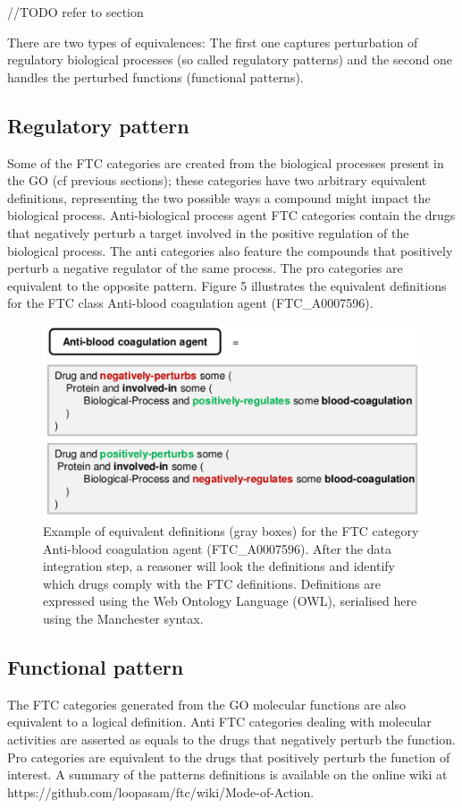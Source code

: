 \documentclass{bioinfo}
\begin{document}
//TODO refer to section

There are two types of equivalences: The first one captures perturbation of regulatory 
biological processes (so called regulatory patterns) and the second one handles the perturbed functions (functional patterns).

\subsection{Regulatory pattern}
Some of the FTC categories are created from the biological processes present in the 
GO (cf previous sections); these categories have two arbitrary equivalent definitions, representing the 
two possible ways a compound might impact the biological process. Anti-biological process agent FTC categories 
contain the drugs that negatively perturb a target involved in the positive regulation of the biological process. 
The anti categories also feature the compounds that positively perturb a negative regulator of the same process. 
The pro categories are equivalent to the opposite pattern. Figure 5 illustrates the equivalent definitions for the 
FTC class Anti-blood coagulation agent (FTC\_A0007596).
 
\begin{figure}[!tpb]%
\centerline{\includegraphics{figS1.png}}
\caption{Example of equivalent definitions (gray boxes) for the FTC category Anti-blood coagulation 
agent (FTC\_A0007596). After the data integration step, a reasoner will look the definitions and identify 
which drugs comply with the FTC definitions. Definitions are expressed using the Web Ontology Language (OWL), 
serialised here using the Manchester syntax.}\label{fig:S01}
\end{figure}

\subsection{Functional pattern}
The FTC categories generated from the GO molecular functions are also equivalent to a logical 
definition. Anti FTC categories dealing with molecular activities are asserted as equals to the drugs 
that negatively perturb the function. Pro categories are equivalent to the drugs that positively perturb the 
function of interest. A summary of the patterns definitions is available on the 
online wiki at {{https://github.com/loopasam/ftc/wiki/Mode-of-Action}}.
\end{document}
